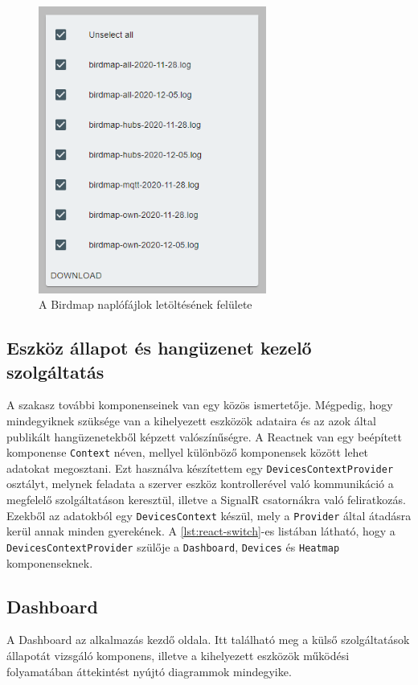 \begin{figure}[!ht]
    \centering
    \includegraphics[width=75mm, keepaspectratio]{figures/birdmap-logs.png}
    \caption{A Birdmap naplófájlok letöltésének felülete}
    \label{fig:birdmap-logs}
\end{figure}
\subsection{Eszköz állapot és hangüzenet kezelő szolgáltatás}
A szakasz további komponenseinek van egy közös ismertetője. Mégpedig, hogy mindegyiknek szüksége van a kihelyezett eszközök adataira
és az azok által publikált hangüzenetekből képzett valószínűségre.
A Reactnek van egy beépített komponense \verb+Context+\cite{react-context} néven, mellyel különböző komponensek között lehet adatokat megosztani.
Ezt használva készítettem egy \verb+DevicesContextProvider+ osztályt, melynek feladata a szerver eszköz kontrollerével való kommunikáció a megfelelő szolgáltatáson keresztül,
illetve a SignalR csatornákra való feliratkozás. Ezekből az adatokból egy \verb+DevicesContext+ készül, mely a \verb+Provider+ által átadásra kerül annak minden gyerekének.
A \ref{lst:react-switch}-es listában látható, hogy a \verb+DevicesContextProvider+ szülője a \verb+Dashboard+, \verb+Devices+ és \verb+Heatmap+ komponenseknek.

\subsection{Dashboard}
A Dashboard az alkalmazás kezdő oldala. Itt található meg a külső szolgáltatások állapotát vizsgáló komponens,
illetve a kihelyezett eszközök működési folyamatában áttekintést nyújtó diagrammok mindegyike.

